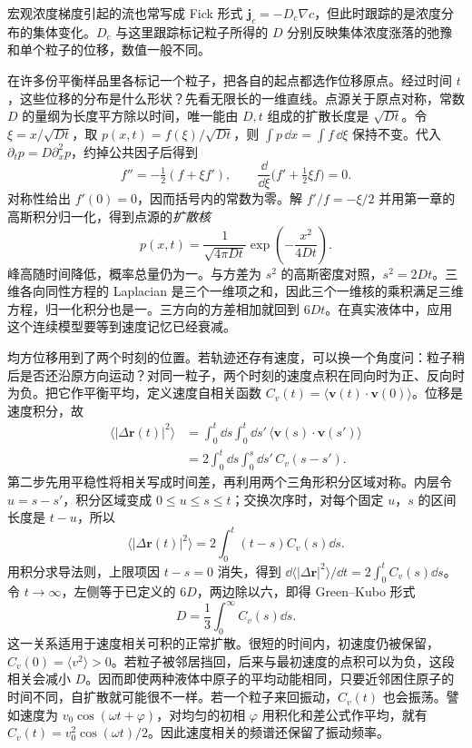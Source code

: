 宏观浓度梯度引起的流也常写成 Fick 形式 $\bm j_c=-D_c\nabla c$，但此时跟踪的是浓度分布的集体变化。$D_c$ 与这里跟踪标记粒子所得的 $D$ 分别反映集体浓度涨落的弛豫和单个粒子的位移，数值一般不同。

在许多份平衡样品里各标记一个粒子，把各自的起点都选作位移原点。经过时间 $t$，这些位移的分布是什么形状？先看无限长的一维直线。点源关于原点对称，常数 $D$ 的量纲为长度平方除以时间，唯一能由 $D,t$ 组成的扩散长度是 $\sqrt{Dt}$。令 $\xi=x/\sqrt{Dt}$，取 $p(x,t)=f(\xi)/\sqrt{Dt}$，则 $\int p\,\dd x=\int f\,\dd\xi$ 保持不变。代入 $\partial_t p=D\partial_x^2p$，约掉公共因子后得到
\[
 f''=-\tfrac12(f+\xi f'),\qquad
 \frac{\dd}{\dd\xi}\bigl(f'+\tfrac12\xi f\bigr)=0 .
\]
对称性给出 $f'(0)=0$，因而括号内的常数为零。解 $f'/f=-\xi/2$ 并用第一章的高斯积分归一化，得到点源的\emph{扩散核}
\begin{equation}\label{transport:heat-kernel}
 p(x,t)=\frac{1}{\sqrt{4\pi Dt}}\exp\!\left(-\frac{x^2}{4Dt}\right).
\end{equation}
峰高随时间降低，概率总量仍为一。与方差为 $s^2$ 的高斯密度对照，$s^2=2Dt$。三维各向同性方程的 Laplacian 是三个一维项之和，因此三个一维核的乘积满足三维方程，归一化积分也是一。三方向的方差相加就回到 $6Dt$。在真实液体中，应用这个连续模型要等到速度记忆已经衰减。

均方位移用到了两个时刻的位置。若轨迹还存有速度，可以换一个角度问：粒子稍后是否还沿原方向运动？对同一粒子，两个时刻的速度点积在同向时为正、反向时为负。把它作平衡平均，定义速度自相关函数 $C_v(t)=\langle\bm v(t)\cdot\bm v(0)\rangle$。位移是速度积分，故
\begin{align}
\langle|\Delta\bm r(t)|^2\rangle
&=\int_0^t\dd s\int_0^t\dd s'\,
\langle\bm v(s)\cdot\bm v(s')\rangle\\
&=2\int_0^t\dd s\int_0^s\dd s'\,C_v(s-s').
\end{align}
第二步先用平稳性将相关写成时间差，再利用两个三角形积分区域对称。内层令 $u=s-s'$，积分区域变成 $0\le u\le s\le t$；交换次序时，对每个固定 $u$，$s$ 的区间长度是 $t-u$，所以
\begin{equation}\label{transport:integrated-correlation}
\langle|\Delta\bm r(t)|^2\rangle=2\int_0^t(t-s)C_v(s)\dd s.
\end{equation}
用积分求导法则，上限项因 $t-s=0$ 消失，得到 $\dd\langle|\Delta\bm r|^2\rangle/\dd t=2\int_0^t C_v(s)\dd s$。令 $t\to\infty$，左侧等于已定义的 $6D$，两边除以六，即得 Green--Kubo 形式
\begin{equation}
D=\frac13\int_0^\infty C_v(s)\dd s.
\end{equation}
这一关系适用于速度相关可积的正常扩散。很短的时间内，初速度仍被保留，$C_v(0)=\langle v^2\rangle>0$。若粒子被邻居挡回，后来与最初速度的点积可以为负，这段相关会减小 $D$。因而即使两种液体中原子的平均动能相同，只要近邻困住原子的时间不同，自扩散就可能很不一样。若一个粒子来回振动，$C_v(t)$ 也会振荡。譬如速度为 $v_0\cos(\omega t+\varphi)$，对均匀的初相 $\varphi$ 用积化和差公式作平均，就有 $C_v(t)=v_0^2\cos(\omega t)/2$。因此速度相关的频谱还保留了振动频率。

